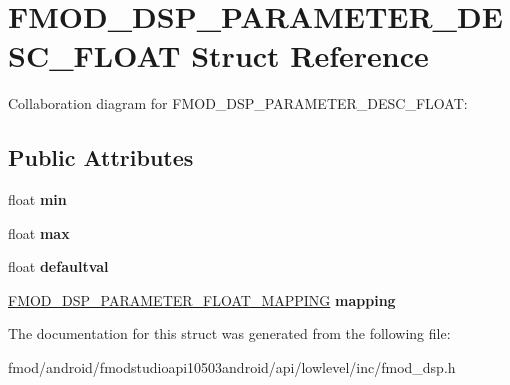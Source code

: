 \hypertarget{struct_f_m_o_d___d_s_p___p_a_r_a_m_e_t_e_r___d_e_s_c___f_l_o_a_t}{\section{F\+M\+O\+D\+\_\+\+D\+S\+P\+\_\+\+P\+A\+R\+A\+M\+E\+T\+E\+R\+\_\+\+D\+E\+S\+C\+\_\+\+F\+L\+O\+A\+T Struct Reference}
\label{struct_f_m_o_d___d_s_p___p_a_r_a_m_e_t_e_r___d_e_s_c___f_l_o_a_t}
}


Collaboration diagram for F\+M\+O\+D\+\_\+\+D\+S\+P\+\_\+\+P\+A\+R\+A\+M\+E\+T\+E\+R\+\_\+\+D\+E\+S\+C\+\_\+\+F\+L\+O\+A\+T\+:
\subsection*{Public Attributes}
\begin{DoxyCompactItemize}
\item 
\hypertarget{struct_f_m_o_d___d_s_p___p_a_r_a_m_e_t_e_r___d_e_s_c___f_l_o_a_t_a579e39ce665f14c1a2be652a51b4f63e}{float {\bfseries min}}\label{struct_f_m_o_d___d_s_p___p_a_r_a_m_e_t_e_r___d_e_s_c___f_l_o_a_t_a579e39ce665f14c1a2be652a51b4f63e}

\item 
\hypertarget{struct_f_m_o_d___d_s_p___p_a_r_a_m_e_t_e_r___d_e_s_c___f_l_o_a_t_a899ee155a9eb4db3d14a7a5931ff0c8d}{float {\bfseries max}}\label{struct_f_m_o_d___d_s_p___p_a_r_a_m_e_t_e_r___d_e_s_c___f_l_o_a_t_a899ee155a9eb4db3d14a7a5931ff0c8d}

\item 
\hypertarget{struct_f_m_o_d___d_s_p___p_a_r_a_m_e_t_e_r___d_e_s_c___f_l_o_a_t_abfdebbfc2b4e3105346ee977161c4268}{float {\bfseries defaultval}}\label{struct_f_m_o_d___d_s_p___p_a_r_a_m_e_t_e_r___d_e_s_c___f_l_o_a_t_abfdebbfc2b4e3105346ee977161c4268}

\item 
\hypertarget{struct_f_m_o_d___d_s_p___p_a_r_a_m_e_t_e_r___d_e_s_c___f_l_o_a_t_a93c38c393c6b749367763cf104c7482b}{\hyperlink{struct_f_m_o_d___d_s_p___p_a_r_a_m_e_t_e_r___f_l_o_a_t___m_a_p_p_i_n_g}{F\+M\+O\+D\+\_\+\+D\+S\+P\+\_\+\+P\+A\+R\+A\+M\+E\+T\+E\+R\+\_\+\+F\+L\+O\+A\+T\+\_\+\+M\+A\+P\+P\+I\+N\+G} {\bfseries mapping}}\label{struct_f_m_o_d___d_s_p___p_a_r_a_m_e_t_e_r___d_e_s_c___f_l_o_a_t_a93c38c393c6b749367763cf104c7482b}

\end{DoxyCompactItemize}


The documentation for this struct was generated from the following file\+:\begin{DoxyCompactItemize}
\item 
fmod/android/fmodstudioapi10503android/api/lowlevel/inc/fmod\+\_\+dsp.\+h\end{DoxyCompactItemize}
